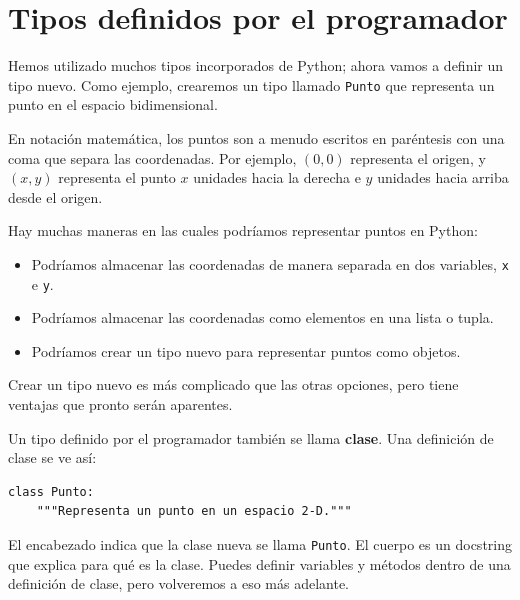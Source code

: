 \documentclass[10pt]{book}
\begin{document}
\section{Tipos definidos por el programador}
\label{point}

Hemos utilizado muchos tipos incorporados de Python; ahora vamos
a definir un tipo nuevo.  Como ejemplo, crearemos un tipo
llamado {\tt Punto} que representa un punto en el espacio
bidimensional.

En notación matemática, los puntos son a menudo escritos en
paréntesis con una coma que separa las coordenadas.  Por ejemplo,
$(0,0)$ representa el origen, y $(x,y)$ representa el
punto $x$ unidades hacia la derecha e $y$ unidades hacia arriba desde el origen.

Hay muchas maneras en las cuales podríamos representar puntos en Python:

\begin{itemize}

\item Podríamos almacenar las coordenadas de manera separada en dos
variables, {\tt x} e {\tt y}.

\item Podríamos almacenar las coordenadas como elementos en una lista
o tupla.

\item Podríamos crear un tipo nuevo para representar puntos como
objetos.

\end{itemize}

Crear un tipo nuevo
es más complicado que las otras opciones, pero
tiene ventajas que pronto serán aparentes.

Un tipo definido por el programador también se llama {\bf clase}.
Una definición de clase se ve así:

\begin{verbatim}
class Punto:
    """Representa un punto en un espacio 2-D."""
\end{verbatim}
%
El encabezado indica que la clase nueva se llama {\tt Punto}.
El cuerpo es un docstring que explica para qué es la clase.
Puedes definir variables y métodos dentro de una definición de clase,
pero volveremos a eso más adelante.
\end{document}
